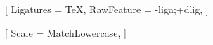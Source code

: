 
\usepackage{fontspec}


\setmainfont{Junicode}[
  Ligatures   = TeX,            %
  RawFeature  = {-liga;+dlig},  %
]

\setmonofont{Liberation Mono}[
  Scale = MatchLowercase,
]
